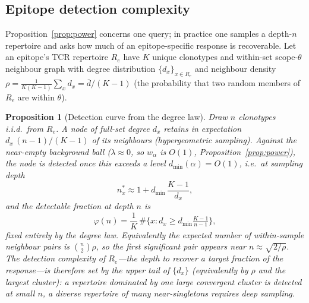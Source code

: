\documentclass[11pt]{article}
\theoremstyle{oldplain}
\newtheorem{proposition}{Proposition}
\theoremstyle{oldrem}
\begin{document}
\subsection{Epitope detection complexity}\label{sec:epitope-complexity}

Proposition~\ref{prop:power} concerns one query; in practice one samples a depth-$n$ repertoire and
asks how much of an epitope-specific response is recoverable. Let an epitope's TCR repertoire
$R_e$ have $K$ unique clonotypes and within-set scope-$\theta$ neighbour graph with degree
distribution $\{d_x\}_{x\in R_e}$ and neighbour density
$\rho = \tfrac{1}{K(K-1)}\sum_x d_x = \overline{d}/(K-1)$ (the probability that two random members of
$R_e$ are within $\theta$).

\begin{proposition}[Detection curve from the degree law]\label{prop:epitope}
Draw $n$ clonotypes i.i.d.\ from $R_e$. A node of full-set degree $d_x$ retains in expectation
$d_x\,(n-1)/(K-1)$ of its neighbours (hypergeometric sampling). Against the near-empty background
ball ($\lambda\approx0$, so $w_\alpha$ is $O(1)$, Proposition~\ref{prop:power}), the node is detected
once this exceeds a level $d_{\min}(\alpha)=O(1)$, i.e.\ at sampling depth
\begin{equation}\label{eq:nstar}
  n^{*}_x \approx 1 + d_{\min}\,\frac{K-1}{d_x},
\end{equation}
and the detectable fraction at depth $n$ is
\begin{equation}\label{eq:phi}
  \varphi(n) = \frac{1}{K}\,\#\Big\{x : d_x \ge d_{\min}\tfrac{K-1}{n-1}\Big\},
\end{equation}
fixed entirely by the degree law. Equivalently the expected number of within-sample neighbour pairs
is $\binom{n}{2}\rho$, so the first significant pair appears near $n\approx\sqrt{2/\rho}$. The
\emph{detection complexity} of $R_e$---the depth to recover a target fraction of the response---is
therefore set by the upper tail of $\{d_x\}$ (equivalently by $\rho$ and the largest cluster): a
repertoire dominated by one large convergent cluster is detected at small $n$, a diverse repertoire
of many near-singletons requires deep sampling.
\end{proposition}
\end{document}
